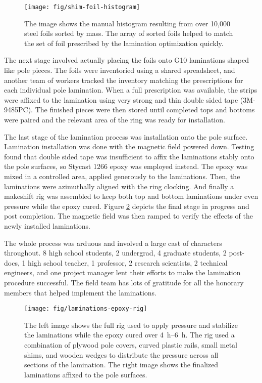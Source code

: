 \begin{figure}
\centering
\texttt{[image: fig/shim-foil-histogram]}
\caption{
    The image shows the manual histogram resulting from over 10,000 steel foils sorted by mass.  The array of sorted foils helped to match the set of foil prescribed by the lamination optimization quickly.
    \label{fig:shim-foil-histogram}
}
\end{figure}

The next stage involved actually placing the foils onto G10 laminations shaped like pole pieces.  The foils were inventoried using a shared spreadsheet, and another team of workers tracked the inventory matching the prescriptions for each individual pole lamination.  When a full prescription was available, the strips were affixed to the lamination using very strong and thin double sided tape (3M-9485PC).  The finished pieces were then stored until completed tops and bottoms were paired and the relevant area of the ring was ready for installation.

The last stage of the lamination process was installation onto the pole surface.  Lamination installation was done with the magnetic field powered down.  Testing found that double sided tape was insufficient to affix the laminations stably onto the pole surfaces, so Stycast 1266 epoxy was employed instead.  The epoxy was mixed in a controlled area, applied generously to the laminations. Then, the laminations were azimuthally aligned with the ring clocking.  And finally a makeshift rig was assembled to keep both top and bottom laminations under even pressure while the epoxy cured.  Figure \ref{fig:laminations-epoxy-rig} depicts the final stage in progress and post completion.  The magnetic field was then ramped to verify the effects of the newly installed laminations.

The whole process was arduous and involved a large cast of characters throughout.  8 high school students, 2 undergrad, 4 graduate students, 2 post-docs, 1 high school teacher, 1 professor, 2 research scientists, 2 technical engineers, and one project manager lent their efforts to make the lamination procedure successful.  The field team has lots of gratitude for all the honorary members that helped implement the laminations.

\begin{figure}
\texttt{[image: fig/laminations-epoxy-rig]}
\caption{
    The left image shows the full rig used to apply pressure and stabilize the laminations while the epoxy cured over \SIrange{4}{6}{\hour}.  The rig used a combination of plywood pole covers, curved plastic rails, small metal shims, and wooden wedges to distribute the pressure across all sections of the lamination.  The right image shows the finalized laminations affixed to the pole surfaces.
    \label{fig:laminations-epoxy-rig}
}
\end{figure}

